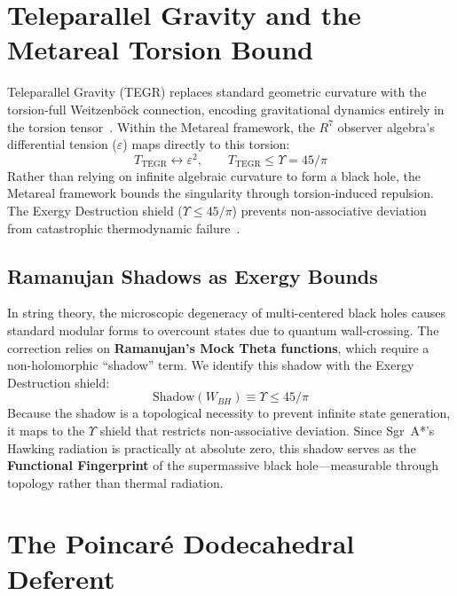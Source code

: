 \section{Teleparallel Gravity and the Metareal Torsion Bound}

Teleparallel Gravity (TEGR) replaces standard geometric curvature with the torsion-full Weitzenb\"{o}ck connection, encoding gravitational dynamics entirely in the torsion tensor~\cite{maluf2013, bahamonde2023}. Within the Metareal framework, the $R^7$ observer algebra's differential tension ($\varepsilon$) maps directly to this torsion:
\begin{equation}
    T_{\text{TEGR}} \longleftrightarrow \varepsilon^2, \qquad T_{\text{TEGR}} \leq \Upsilon = 45/\pi
\end{equation}
Rather than relying on infinite algebraic curvature to form a black hole, the Metareal framework bounds the singularity through torsion-induced repulsion. The Exergy Destruction shield ($\Upsilon \leq 45/\pi$) prevents non-associative deviation from catastrophic thermodynamic failure~\cite{layden2025}.

\subsection{Ramanujan Shadows as Exergy Bounds}

In string theory, the microscopic degeneracy of multi-centered black holes causes standard modular forms to overcount states due to quantum wall-crossing. The correction relies on \textbf{Ramanujan's Mock Theta functions}, which require a non-holomorphic ``shadow'' term. We identify this shadow with the Exergy Destruction shield:
\begin{equation}
    \text{Shadow}(W_{BH}) \equiv \Upsilon \leq 45/\pi
\end{equation}
Because the shadow is a topological necessity to prevent infinite state generation, it maps to the $\Upsilon$ shield that restricts non-associative deviation. Since Sgr~A*'s Hawking radiation is practically at absolute zero, this shadow serves as the \textbf{Functional Fingerprint} of the supermassive black hole---measurable through topology rather than thermal radiation.

\section{The Poincar\'{e} Dodecahedral Deferent}

